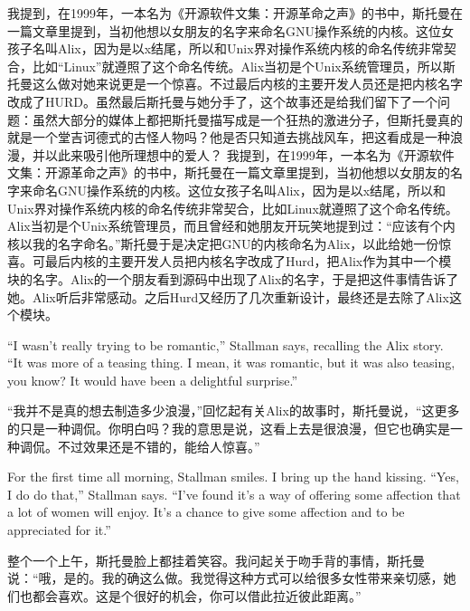 \ifdefined\chs
\ifdefined\vone
我提到，在1999年，一本名为《开源软件文集：开源革命之声》的书中，斯托曼在一篇文章里提到，当初他想以女朋友的名字来命名GNU操作系统的内核。这位女孩子名叫Alix，因为是以x结尾，所以和Unix界对操作系统内核的命名传统非常契合，比如``Linux''就遵照了这个命名传统。Alix当初是个Unix系统管理员，所以斯托曼这么做对她来说更是一个惊喜。不过最后内核的主要开发人员还是把内核名字改成了HURD。虽然最后斯托曼与她分手了，这个故事还是给我们留下了一个问题：虽然大部分的媒体上都把斯托曼描写成是一个狂热的激进分子，但斯托曼真的就是一个堂吉诃德式的古怪人物吗？他是否只知道去挑战风车，把这看成是一种浪漫，并以此来吸引他所理想中的爱人？
\fi
\ifdefined\vtwo
我提到，在1999年，一本名为《开源软件文集：开源革命之声》的书中，斯托曼在一篇文章里提到，当初他想以女朋友的名字来命名GNU操作系统的内核。这位女孩子名叫Alix，因为是以x结尾，所以和Unix界对操作系统内核的命名传统非常契合，比如Linux就遵照了这个命名传统。Alix当初是个Unix系统管理员，而且曾经和她朋友开玩笑地提到过：``应该有个内核以我的名字命名。''斯托曼于是决定把GNU的内核命名为Alix，以此给她一份惊喜。可最后内核的主要开发人员把内核名字改成了Hurd，把Alix作为其中一个模块的名字。Alix的一个朋友看到源码中出现了Alix的名字，于是把这件事情告诉了她。Alix听后非常感动。之后Hurd又经历了几次重新设计，最终还是去除了Alix这个模块。
\fi
\fi

\ifdefined\vone
\ifdefined\eng
``I wasn't really trying to be romantic,'' Stallman says, recalling the Alix story. ``It was more of a teasing thing. I mean, it was romantic, but it was also teasing, you know? It would have been a delightful surprise.''
\fi

\ifdefined\vtwo
``我并不是真的想去制造多少浪漫，''回忆起有关Alix的故事时，斯托曼说，``这更多的只是一种调侃。你明白吗？我的意思是说，这看上去是很浪漫，但它也确实是一种调侃。不过效果还是不错的，能给人惊喜。''
\fi
\fi

\ifdefined\eng
For the first time all morning, Stallman smiles. I bring up the hand kissing. ``Yes, I do do that,'' Stallman says. ``I've found it's a way of offering some affection that a lot of women will enjoy. It's a chance to give some affection and to be appreciated for it.''
\fi

\ifdefined\chs
整个一个上午，斯托曼脸上都挂着笑容。我问起关于吻手背的事情，斯托曼说：``哦，是的。我的确这么做。我觉得这种方式可以给很多女性带来亲切感，她们也都会喜欢。这是个很好的机会，你可以借此拉近彼此距离。''
\fi

